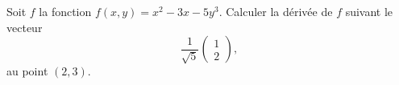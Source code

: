 \begin{exercice}\label{exoGeomAnal-0030}

Soit $f$ la fonction $f(x,y) = x^2-3x-5y^3$. Calculer la dérivée de $f$ suivant le vecteur 
\begin{equation}
 \frac{1}{\sqrt{5}} \begin{pmatrix}
   1\\
   2
 \end{pmatrix},
\end{equation}
au point $(2,3)$.


\end{exercice}
